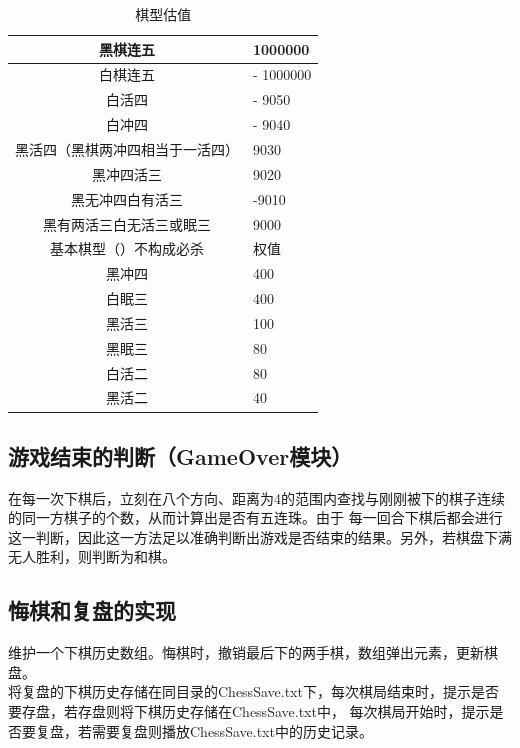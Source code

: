 \documentclass{acm_proc_article-sp}
\begin{document}
\begin{table}
    \small
	\centering
	\caption{棋型估值}
	\begin{tabular}{|c|l|} \hline
	黑棋连五 & 1000000 \\ \hline
	 白棋连五 &- 1000000 \\ \hline
	 白活四 &- 9050 \\ \hline
	 白冲四 &- 9040 \\ \hline
	 黑活四（黑棋两冲四相当于一活四） &9030 \\ \hline
	 黑冲四活三& 9020 \\ \hline
	 黑无冲四白有活三 &-9010\\ \hline
	 
	 黑有两活三白无活三或眠三& 9000 \\ \hline
	基本棋型（）不构成必杀 &  权值\\ \hline
	 黑冲四 &  400\\ \hline
	 白眠三 &  400\\ \hline
	 黑活三 &  100\\ \hline
     黑眠三 &  80\\ \hline
     白活二    &  80\\ \hline
     黑活二     &  40\\ \hline
	\end{tabular}
\end{table}

\subsection{\textbf{游戏结束的判断（GameOver模块）}}
在每一次下棋后，立刻在八个方向、距离为4的范围内查找与刚刚被下的棋子连续的同一方棋子的个数，从而计算出是否有五连珠。由于
每一回合下棋后都会进行这一判断，因此这一方法足以准确判断出游戏是否结束的结果。另外，若棋盘下满无人胜利，则判断为和棋。
\subsection{\textbf{悔棋和复盘的实现}}
维护一个下棋历史数组。悔棋时，撤销最后下的两手棋，数组弹出元素，更新棋盘。\\
将复盘的下棋历史存储在同目录的ChessSave.txt下，每次棋局结束时，提示是否要存盘，若存盘则将下棋历史存储在ChessSave.txt中，
每次棋局开始时，提示是否要复盘，若需要复盘则播放ChessSave.txt中的历史记录。\\
\end{document}

